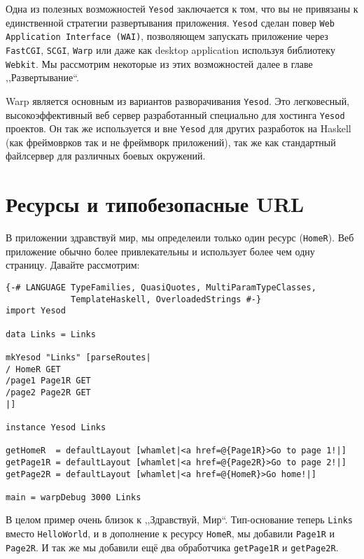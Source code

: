 Одна из полезных возможностей \texttt{Yesod} заключается к том, 
что вы не привязаны к единственной стратегии развертывания приложения. 
\texttt{Yesod} сделан повер \texttt{Web Application Interface (WAI)}, 
позволяющем запускать приложение через \texttt{FastCGI}, 
\texttt{SCGI}, \texttt{Warp} или даже как 
desktop application используя библиотеку
\texttt{Webkit}. Мы рассмотрим некоторые из этих возможностей 
далее в главе ,,Развертывание``.

Warp является основным из вариантов разворачивания \texttt{Yesod}. 
Это легковесный, высокоэффективный веб сервер разработанный 
специально для хостинга \texttt{Yesod} проектов. Он так же используется 
и вне \texttt{Yesod} для других разработок на Haskell (как фреймоврков 
так и не фреймворк приложений), так же как стандартный файлсервер 
для различных боевых окружений.

\section{Ресурсы и типобезопасные URL}

В приложении здравствуй мир, мы определеили только один ресурс 
(\lstinline!HomeR!). Веб приложение обычно более привлекательны и  использует более чем одну страницу. Давайте рассмотрим:

\begin{lstlisting}
{-# LANGUAGE TypeFamilies, QuasiQuotes, MultiParamTypeClasses,
             TemplateHaskell, OverloadedStrings #-}
import Yesod

data Links = Links

mkYesod "Links" [parseRoutes|
/ HomeR GET
/page1 Page1R GET
/page2 Page2R GET
|]

instance Yesod Links

getHomeR  = defaultLayout [whamlet|<a href=@{Page1R}>Go to page 1!|]
getPage1R = defaultLayout [whamlet|<a href=@{Page2R}>Go to page 2!|]
getPage2R = defaultLayout [whamlet|<a href=@{HomeR}>Go home!|]

main = warpDebug 3000 Links
\end{lstlisting}

В целом пример очень близок к ,,Здравствуй, Мир``. Тип-основание
теперь \lstinline!Links! вместо \lstinline!HelloWorld!, и в дополнение 
к ресурсу \lstinline!HomeR!, мы добавили \lstinline!Page1R! и 
\lstinline!Page2R!. И так же мы добавили ещё 
два обработчика \lstinline!getPage1R! и \lstinline!getPage2R!.

